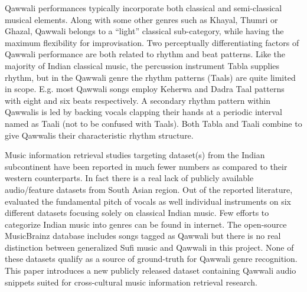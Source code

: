 \documentclass{article}
\begin{document}
Qawwali performances typically incorporate both classical and semi-classical musical elements.
Along with some other genres such as Khayal, Thumri or Ghazal, Qawwali belongs to a “light” classical \citep{qureshi1986sufi} sub-category, while having the maximum flexibility for improvisation. Two perceptually differentiating factors of Qawwali performance are both related to rhythm and beat patterns. Like the majority of Indian classical music, the percussion instrument Tabla  supplies rhythm, but in the Qawwali genre the rhythm patterns (Taals) are quite limited in scope. E.g. most Qawwali songs employ Keherwa  and Dadra Taal patterns with eight and six beats respectively. A secondary rhythm pattern within Qawwalis is led by backing vocals clapping their hands at a periodic interval named as Taali (not to be confused with Taals). Both Tabla and Taali combine to give Qawwalis their characteristic rhythm structure.

Music information retrieval studies targeting dataset(s) from the Indian subcontinent have been reported in much fewer numbers as compared to their western counterparts. In fact there is a real lack of publicly available audio/feature datasets from South Asian region. Out of the reported literature, \citep{carnatic_dataset} evaluated the fundamental pitch of vocals as well individual instruments on six different datasets focusing solely on classical Indian music. Few efforts to categorize Indian music into genres can be found in internet. The open-source MusicBrainz database includes songs tagged as Qawwali but there is no real distinction between generalized Sufi music and Qawwali in this project. None of these datasets qualify as a source of ground-truth for Qawwali genre recognition. This paper introduces a new publicly released dataset containing Qawwali audio snippets suited for cross-cultural music information retrieval research.
\end{document}

